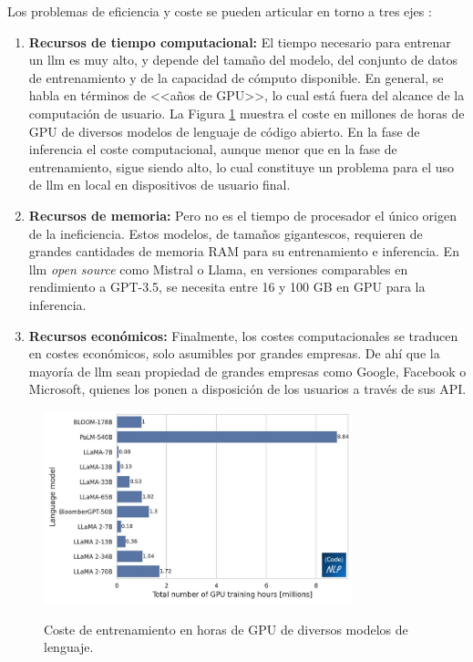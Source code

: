 Los problemas de eficiencia y coste se pueden articular en torno a tres ejes \citep{arunbijiRAGVsFinetuning}:

\begin{enumerate}[label=\alph*)]
    \item \textbf{Recursos de tiempo computacional:} El tiempo necesario para entrenar un \gls{llm} es muy alto, y depende del tamaño del modelo, del conjunto de datos de entrenamiento y de la capacidad de cómputo disponible. En general, se habla en términos de <<años de GPU>>, lo cual está fuera del alcance de la computación de usuario. La Figura \ref{fig:llm_gpu_training_hours} muestra el coste en millones de horas de GPU de diversos modelos de lenguaje de código abierto. En la fase de inferencia el coste computacional, aunque menor que en la fase de entrenamiento, sigue siendo alto, lo cual constituye un problema para el uso de \gls{llm} en local en dispositivos de usuario final.
    \item \textbf{Recursos de memoria:} Pero no es el tiempo de procesador el único origen de la ineficiencia. Estos modelos, de tamaños gigantescos, requieren de grandes cantidades de memoria RAM para su entrenamiento e inferencia. En \gls{llm} \emph{open source} como Mistral o Llama, en versiones comparables en rendimiento a GPT-3.5, se necesita entre 16 y 100 GB en GPU para la inferencia. 
    \item \textbf{Recursos económicos:} Finalmente, los costes computacionales se traducen en costes económicos, solo asumibles por grandes empresas. De ahí que la mayoría de \gls{llm} sean propiedad de grandes empresas como Google, Facebook o Microsoft, quienes los ponen a disposición de los usuarios a través de sus API.
\end{enumerate}

\begin{figure}[H]
    \caption[Coste de entrenamiento en horas de GPU de diversos modelos de lenguaje]{Coste de entrenamiento en horas de GPU de diversos modelos de lenguaje.}
    \centering
    \includegraphics[width=0.8\textwidth]{./figuras/llm_gpu_training_hours.png}
    \label{fig:llm_gpu_training_hours}
  \end{figure}

